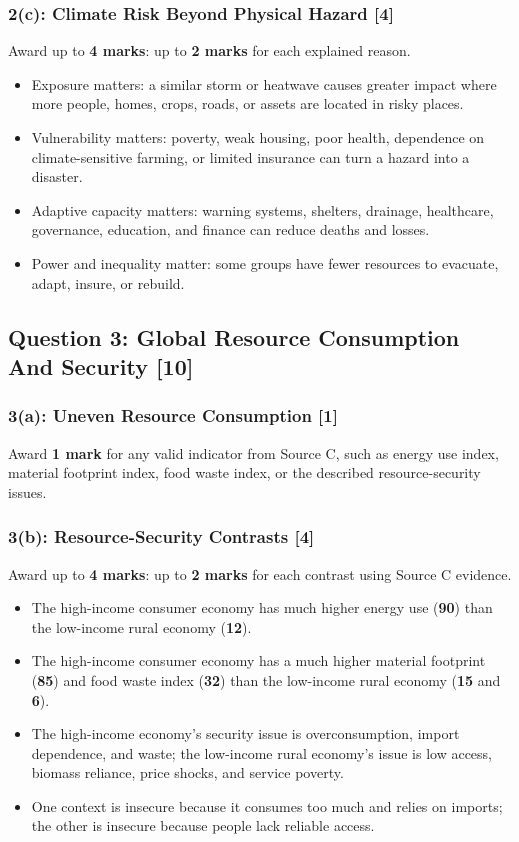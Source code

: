 \documentclass[11pt,a4paper]{article}
\newcommand{\term}[1]{\textcolor{HeadingBlue}{\textbf{#1}}}
\newcommand{\score}[1]{\textcolor{AccentTeal}{\textbf{#1}}}
\begin{document}
\subsubsection{2(c): Climate Risk Beyond Physical Hazard [4]}

Award up to \score{4 marks}: up to \score{2 marks} for each explained reason.

\begin{itemize}
  \item Exposure matters: a similar storm or heatwave causes greater impact
  where more people, homes, crops, roads, or assets are located in risky places.
  \item Vulnerability matters: poverty, weak housing, poor health, dependence on
  climate-sensitive farming, or limited insurance can turn a hazard into a
  disaster.
  \item Adaptive capacity matters: warning systems, shelters, drainage,
  healthcare, governance, education, and finance can reduce deaths and losses.
  \item Power and inequality matter: some groups have fewer resources to
  evacuate, adapt, insure, or rebuild.
\end{itemize}

\subsection{Question 3: Global Resource Consumption And Security [10]}

\subsubsection{3(a): Uneven Resource Consumption [1]}

Award \score{1 mark} for any valid indicator from Source C, such as energy use
index, material footprint index, food waste index, or the described
resource-security issues.

\subsubsection{3(b): Resource-Security Contrasts [4]}

Award up to \score{4 marks}: up to \score{2 marks} for each contrast using
Source C evidence.

\begin{itemize}
  \item The high-income consumer economy has much higher energy use
  (\term{90}) than the low-income rural economy (\term{12}).
  \item The high-income consumer economy has a much higher material footprint
  (\term{85}) and food waste index (\term{32}) than the low-income rural
  economy (\term{15} and \term{6}).
  \item The high-income economy's security issue is overconsumption, import
  dependence, and waste; the low-income rural economy's issue is low access,
  biomass reliance, price shocks, and service poverty.
  \item One context is insecure because it consumes too much and relies on
  imports; the other is insecure because people lack reliable access.
\end{itemize}
\end{document}
